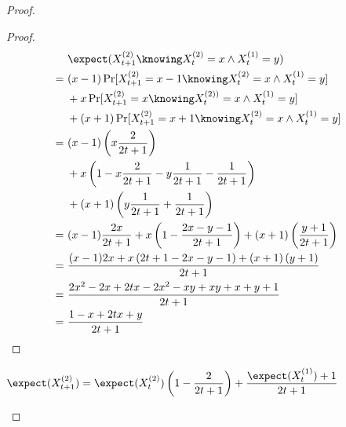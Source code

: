 \begin{proof}
    \begin{proof}
        \begin{align*}
            &\ \expect(X_{t + 1}^{(2)} \knowing X_t^{(2)} = x \wedge X_t^{(1)} = y)                                                         & \\
            =&\ (x - 1) \Pr[X_{t + 1}^{(2)} = x - 1 \knowing X_t^{(2)} = x \wedge X_t^{(1)} = y]                                            & \\
            &\; + x \Pr[X_{t + 1}^{(2)} = x \knowing X_t^{(2))} = x \wedge X_t^{(1)} = y]                                                   & \\
            &\; + (x + 1) \Pr[X_{t + 1}^{(2)} = x + 1 \knowing X_t^{(2)} = x \wedge X_t^{(1)} = y]                                          & \\
            =&\ (x - 1) \left( x \frac{2}{2t + 1} \right)                                                                                   & \\
            &\; + x \left( 1 - x \frac{2}{2t + 1} - y \frac{1}{2t + 1} - \frac{1}{2t + 1} \right)                                           & \\
            &\; + (x + 1) \left( y \frac{1}{2t + 1} + \frac{1}{2t + 1} \right)                                                              & \\
            =&\ (x - 1) \frac{2x}{2t + 1} + x \left( 1 - \frac{2x - y - 1}{2t + 1} \right) + (x + 1) \left( \frac{y + 1}{2t + 1} \right)    & \\
            =&\ \frac{(x - 1) {2x} + x \left( 2t + 1 - 2x - y - 1 \right) + (x + 1) \left( {y + 1} \right)}{2t + 1}                         & \\
            =&\ \frac{2x^2 - 2x + 2tx - 2x^2 - xy + xy + x + y + 1}{2t + 1}                                                                 & \\
            =&\ \frac{1 - x + 2tx + y}{2t + 1}                                                                                              & \\
        \end{align*}
    \end{proof}

    \begin{lem}\label{l:pref-att-5}
        $\displaystyle \expect(X_{t + 1}^{(2)}) = \expect(X_t^{(2)}) \left( 1 - \frac{2}{2t + 1} \right) + \frac{\expect(X_t^{(1)}) + 1}{2t + 1}$
    \end{lem}
\end{proof}
